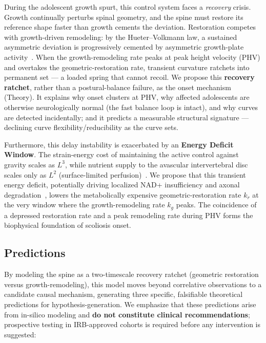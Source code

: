 During the adolescent growth spurt, this control system faces a \emph{recovery} crisis. Growth continually perturbs spinal geometry, and the spine must restore its reference shape faster than growth cements the deviation. Restoration competes with growth-driven remodeling: by the Hueter--Volkmann law, a sustained asymmetric deviation is progressively cemented by asymmetric growth-plate activity~\cite{stokes1996mechanical, stokes2007growth, villemure2009growth}. When the growth-remodeling rate peaks at peak height velocity (PHV) and overtakes the geometric-restoration rate, transient curvature ratchets into permanent set --- a loaded spring that cannot recoil. We propose this \textbf{recovery ratchet}, rather than a postural-balance failure, as the onset mechanism (Theory). It explains why onset clusters at PHV, why affected adolescents are otherwise neurologically normal (the fast balance loop is intact), and why curves are detected incidentally; and it predicts a measurable structural signature --- declining curve flexibility/reducibility as the curve sets.

Furthermore, this delay instability is exacerbated by an \textbf{Energy Deficit Window}. The strain-energy cost of maintaining the active control against gravity scales as $L^3$, while nutrient supply to the avascular intervertebral disc scales only as $L^2$ (surface-limited perfusion)~\cite{urban2004nutrition}. We propose that this transient energy deficit, potentially driving localized NAD+ insufficiency and axonal degradation~\cite{basse2021nampt, gerdts2015sarm1}, lowers the metabolically expensive geometric-restoration rate $k_r$ at the very window where the growth-remodeling rate $k_g$ peaks. The coincidence of a depressed restoration rate and a peak remodeling rate during PHV forms the biophysical foundation of scoliosis onset.

\subsection{Predictions}
By modeling the spine as a two-timescale recovery ratchet (geometric restoration versus growth-remodeling), this model moves beyond correlative observations to a candidate causal mechanism, generating three specific, falsifiable theoretical predictions for hypothesis-generation. We emphasize that these predictions arise from in-silico modeling and \textbf{do not constitute clinical recommendations}; prospective testing in IRB-approved cohorts is required before any intervention is suggested:

